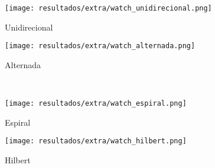 \begin{subfigure}{0.33\textwidth}
    \centering
    \texttt{[image: resultados/extra/watch\_unidirecional.png]}
    \caption{Unidirecional}
    \label{fig:watch:unidirecional}
\end{subfigure}%
\begin{subfigure}{0.33\textwidth}
    \centering
    \texttt{[image: resultados/extra/watch\_alternada.png]}
    \caption{Alternada}
    \label{fig:watch:alternada}
\end{subfigure}\\[8pt]
\begin{subfigure}{0.33\textwidth}
    \centering
    \texttt{[image: resultados/extra/watch\_espiral.png]}
    \caption{Espiral}
    \label{fig:watch:espiral}
\end{subfigure}%
\begin{subfigure}{0.33\textwidth}
    \centering
    \texttt{[image: resultados/extra/watch\_hilbert.png]}
    \caption{Hilbert}
    \label{fig:watch:hilbert}
\end{subfigure}